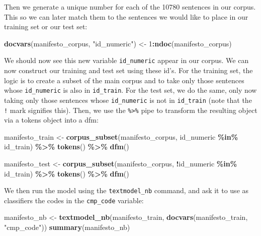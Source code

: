 \documentclass[
]{book}
\newenvironment{Shaded}{\begin{snugshade}}{\end{snugshade}}
\newcommand{\DecValTok}[1]{\textcolor[rgb]{0.00,0.00,0.81}{#1}}
\newcommand{\FunctionTok}[1]{\textcolor[rgb]{0.13,0.29,0.53}{\textbf{#1}}}
\newcommand{\NormalTok}[1]{#1}
\newcommand{\OtherTok}[1]{\textcolor[rgb]{0.56,0.35,0.01}{#1}}
\newcommand{\SpecialCharTok}[1]{\textcolor[rgb]{0.81,0.36,0.00}{\textbf{#1}}}
\newcommand{\StringTok}[1]{\textcolor[rgb]{0.31,0.60,0.02}{#1}}
\begin{document}
Then we generate a unique number for each of the 10780 sentences in our corpus. This so we can later match them to the sentences we would like to place in our training set or our test set:

\begin{Shaded}
\begin{Highlighting}[]
\FunctionTok{docvars}\NormalTok{(manifesto\_corpus, }\StringTok{"id\_numeric"}\NormalTok{) }\OtherTok{\textless{}{-}} \DecValTok{1}\SpecialCharTok{:}\FunctionTok{ndoc}\NormalTok{(manifesto\_corpus)}
\end{Highlighting}
\end{Shaded}

We should now see this new variable \texttt{id\_numeric} appear in our corpus. We can now construct our training and test set using these id's. For the training set, the logic is to create a subset of the main corpus and to take only those sentences whose \texttt{id\_numeric} is also in \texttt{id\_train}. For the test set, we do the same, only now taking only those sentences whose \texttt{id\_numeric} is not in \texttt{id\_train} (note that the \texttt{!} mark signifies this). Then, we use the \texttt{\%\textgreater{}\%} pipe to transform the resulting object via a tokens object into a dfm:

\begin{Shaded}
\begin{Highlighting}[]
\NormalTok{manifesto\_train }\OtherTok{\textless{}{-}} \FunctionTok{corpus\_subset}\NormalTok{(manifesto\_corpus, id\_numeric }\SpecialCharTok{\%in\%}\NormalTok{ id\_train) }\SpecialCharTok{\%\textgreater{}\%}
 \FunctionTok{tokens}\NormalTok{() }\SpecialCharTok{\%\textgreater{}\%}
 \FunctionTok{dfm}\NormalTok{()}

\NormalTok{manifesto\_test }\OtherTok{\textless{}{-}} \FunctionTok{corpus\_subset}\NormalTok{(manifesto\_corpus, }\SpecialCharTok{!}\NormalTok{id\_numeric }\SpecialCharTok{\%in\%}\NormalTok{ id\_train) }\SpecialCharTok{\%\textgreater{}\%}
 \FunctionTok{tokens}\NormalTok{() }\SpecialCharTok{\%\textgreater{}\%}
 \FunctionTok{dfm}\NormalTok{()}
\end{Highlighting}
\end{Shaded}

We then run the model using the \texttt{textmodel\_nb} command, and ask it to use as classifiers the codes in the \texttt{cmp\_code} variable:

\begin{Shaded}
\begin{Highlighting}[]
\NormalTok{manifesto\_nb }\OtherTok{\textless{}{-}} \FunctionTok{textmodel\_nb}\NormalTok{(manifesto\_train, }\FunctionTok{docvars}\NormalTok{(manifesto\_train, }\StringTok{"cmp\_code"}\NormalTok{))}
\FunctionTok{summary}\NormalTok{(manifesto\_nb)}
\end{Highlighting}
\end{Shaded}
\end{document}
